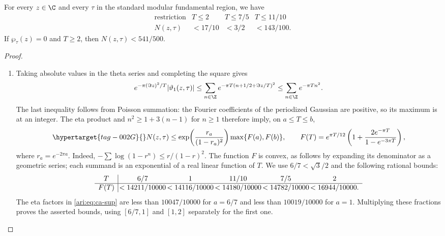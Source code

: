 \begin{proposition}\hypertarget{tag-001J}{}\label{ari:C.8.1}

For every $z\in\C$ and every $\tau$ in the standard modular
fundamental region, we have
\[
 \begin{array}{c|ccc}
 \text{restriction}&T\le2&T\le7/5&T\le11/10\\ \hline
 N(z,\tau)&<17/10&<3/2&<143/100.
 \end{array}
\]
If $\wp_\tau(z)=0$ and $T\ge2$, then $N(z,\tau)<541/500$.
\end{proposition}


\begin{proof}
\begin{enumerate}[label=\arabic*.,leftmargin=*]
\item Taking absolute values in the theta series and completing the square
gives
\[
 e^{-\pi(\Im z)^2/T}|\vartheta_1(z,\tau)|
 \le\sum_{n\in\Z}
 e^{-\pi T(n+1/2+\Im z/T)^2}
 \le\sum_{n\in\Z}e^{-\pi Tn^2}.
\]
The last inequality follows from Poisson summation: the Fourier
coefficients of the periodized Gaussian are positive, so its maximum
is at an integer. The eta product and $n^2\ge1+3(n-1)$ for $n\ge1$
therefore imply, on $a\le T\le b$,
\begin{equation}\hypertarget{tag-002G}{}\label{ari:eq:ca-sup}
 N(z,\tau)\le
 \exp\!\left(\frac{r_a}{(1-r_a)^2}\right)
 \max\{F(a),F(b)\},\qquad
 F(T)=e^{\pi T/12}
 \left(1+\frac{2e^{-\pi T}}{1-e^{-3\pi T}}\right),
\end{equation}
where $r_a=e^{-2\pi a}$. Indeed,
$-\sum\log(1-r^n)\le r/(1-r)^2$. The function $F$ is convex,
as follows by expanding its denominator as a geometric series;
each summand is an exponential of a real linear function of $T$.
We use $6/7<\sqrt3/2$ and the following rational bounds:
\[
\begin{array}{c|@{\,}c@{\,}c@{\,}c@{\,}c@{\,}c}
T&6/7&1&11/10&7/5&2\\ \hline
F(T)&<14211/10000&<14116/10000&<14180/10000&<14782/10000&<16944/10000.
\end{array}
\]
The eta factors in \eqref{ari:eq:ca-sup} are less than $10047/10000$
for $a=6/7$ and less than $10019/10000$ for $a=1$.
Multiplying these fractions proves the asserted bounds, using
$[6/7,1]$ and $[1,2]$ separately for the first one.


\end{enumerate}
\end{proof}
